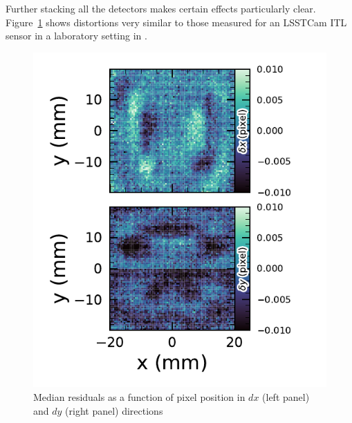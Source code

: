 Further stacking all the detectors makes certain effects particularly clear.
Figure~\ref{fig:Astrometry_CCD} shows distortions very similar to those measured for an \gls{LSSTCam} \gls{ITL} sensor in a laboratory setting in \citet{2023PASP..135k5003E}.
\begin{figure}[htb!]
\centering
\includegraphics[width=1.0\linewidth]{Astrometry_CCD.pdf}
\caption{\small Median residuals as a function of pixel position in $dx$ (left panel) and $dy$ (right panel) directions}
\label{fig:Astrometry_CCD}
\end{figure}



